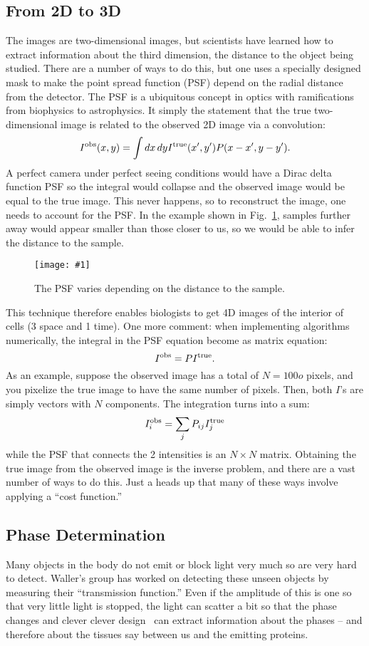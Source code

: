 \documentclass[prd,amsmath,aps,floats,amssymb, floatfix,
  superscriptaddress,nofootinbib]{revtex4-1}
\newcommand{\sfig}[2]{
\texttt{[image: \#1]}
        }
\newcommand{\Spng}[2]{
    \begin{figure}[thbp]
    \sfig{Figures/#1.png}{0.65\columnwidth}
    \caption{{\small #2}}
    \label{fig:#1}
    \end{figure}
}
\newcommand{\rf}[1]{\ref{fig:#1}}
\newcommand{\eql}[1]{\label{eq:#1}}
\numberwithin{equation}{section}
\newcommand\be{\begin{equation}}
\newcommand\ee{\end{equation}}
\begin{document}
\subsection{From 2D to 3D}

The images are two-dimensional images, but scientists have learned how to extract information about the third dimension, the distance to the object being studied. There are a number of ways to do this, but one \cite{unknown} uses a specially designed mask to make the point spread function (PSF) depend on the radial distance from the detector. The PSF is a ubiquitous concept in optics with ramifications from biophysics to astrophysics. It simply the statement that the true two-dimensional image is related to the observed 2D image via a convolution:
\be
I^{\rm obs}(x,y) = \int dx\,dy I^{\rm true}(x',y') P(x-x',y-y').\ee
A perfect camera under perfect seeing conditions would have a Dirac delta function PSF so the integral would collapse and the observed image would be equal to the true image. This never happens, so to reconstruct the image, one needs to account for the PSF. In the example shown in Fig.~\rf{phasemask}, samples further away would appear smaller than those closer to us, so we would be able to infer the distance to the sample.

\Spng{phasemask}{The PSF varies depending on the distance to the sample.}

This technique therefore enables biologists to get 4D images of the interior of cells (3 space and 1 time). One more comment: when implementing algorithms numerically, the integral in the PSF equation become as matrix equation:
\be
I^{\rm obs} = P I^{\rm true}\eql{iobitr}
.\ee
As an example, suppose the observed image has a total of $N=100o$ pixels, and you pixelize the true image to have the same number of pixels. Then, both $I$'s are simply vectors with $N$ components. The integration turns into a sum:
\be
I^{\rm obs}_i = \sum_j P_{ij} I^{\rm true}_j
\ee
while the PSF that connects the 2 intensities is an $N\times N$ matrix.
Obtaining the true image from the observed image is the inverse problem, and there are a vast number of ways to do this. Just a heads up that many of these ways involve applying a ``cost function.'' 

\subsection{Phase Determination}

Many objects in the body do not emit or block light very much so are very hard to detect. Waller's group has worked on detecting these unseen objects by measuring their ``transmission function.'' Even if the amplitude of this is one so that very little light is stopped, the light can scatter a bit so that the phase changes and clever  clever design~\cite{bostan2020deep} can extract information about the phases -- and therefore about the tissues say between us and the emitting proteins. 
\end{document}
